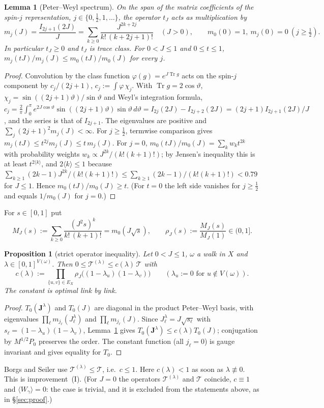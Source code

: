 \documentclass[11pt,a4paper]{article}
\theoremstyle{plain}
\newtheorem{proposition}[theorem]{Proposition}
\newtheorem{lemma}[theorem]{Lemma}
\theoremstyle{remark}
\numberwithin{equation}{section}
\newcommand{\Tr}{\operatorname{Tr}}
\newcommand{\cT}{\mathcal{T}}
\newcommand{\bs}{\boldsymbol}
\begin{document}
\begin{lemma}[Peter--Weyl spectrum]\label{lem:pw}
On the span of the matrix coefficients of the spin-$j$ representation, $j\in\{0,\frac12,1,\dots\}$, the operator $t_J$ acts as
multiplication by
\[
m_j(J)=\frac{I_{2j+1}(2J)}{J}=\sum_{k\ge0}\frac{J^{2k+2j}}{k!\,(k+2j+1)!}\quad(J>0),\qquad m_0(0)=1,\ m_j(0)=0\ (j\ge\tfrac12).
\]
In particular $t_J\ge0$ and $t_J$ is trace class. For $0<J\le1$ and $0\le t\le1$, $m_j(tJ)/m_j(J)\le m_0(tJ)/m_0(J)$ for every
$j$.
\end{lemma}
\begin{proof}
Convolution by the class function $\varphi(g)=e^{J\Tr g}$ acts on the spin-$j$ component by $c_j/(2j+1)$, $c_j:=\int\varphi\,\chi_j$.
With $\Tr g=2\cos\vartheta$, $\chi_j=\sin((2j+1)\vartheta)/\sin\vartheta$ and Weyl's integration formula,
$c_j=\frac2\pi\int_0^\pi e^{2J\cos\vartheta}\sin((2j+1)\vartheta)\sin\vartheta\,d\vartheta=I_{2j}(2J)-I_{2j+2}(2J)=(2j+1)I_{2j+1}(2J)/J$,
and the series is that of $I_{2j+1}$. The eigenvalues are positive and $\sum_j(2j+1)^2m_j(J)<\infty$.
For $j\ge\frac12$, termwise comparison gives $m_j(tJ)\le t^{2j}m_j(J)\le t\,m_j(J)$. For $j=0$, $m_0(tJ)/m_0(J)=\sum_kw_kt^{2k}$ with
probability weights $w_k\propto J^{2k}/(k!(k+1)!)$; by Jensen's inequality this is at least $t^{2\langle k\rangle}$, and
$2\langle k\rangle\le1$ because $\sum_{k\ge1}(2k-1)J^{2k}/(k!(k+1)!)\le\sum_{k\ge1}(2k-1)/(k!(k+1)!)<0.79$ for $J\le1$. Hence
$m_0(tJ)/m_0(J)\ge t$. (For $t=0$ the left side vanishes for $j\ge\frac12$ and equals $1/m_0(J)$ for $j=0$.)
\end{proof}

For $s\in[0,1]$ put
\begin{equation}\label{eq:rho}
M_J(s):=\sum_{k\ge0}\frac{(J^2s)^k}{k!\,(k+1)!}=m_0(J\sqrt s),\qquad \rho_J(s):=\frac{M_J(s)}{M_J(1)}\in(0,1].
\end{equation}

\begin{proposition}[strict operator inequality]\label{prop:strict}
Let $0<J\le1$, $\omega$ a walk in $X$ and $\lambda\in[0,1]^{V(\omega)}$. Then $0\le\cT^{(\lambda)}\le c(\lambda)\,\cT$ with
\[
c(\lambda):=\prod_{\{u,v\}\in E_X}\rho_J\big((1-\lambda_u)(1-\lambda_v)\big)\qquad(\lambda_u:=0\text{ for }u\notin V(\omega)).
\]
The constant is optimal link by link.
\end{proposition}
\begin{proof}
$T_0(\bs J^\lambda)$ and $T_0(J)$ are diagonal in the product Peter--Weyl basis, with eigenvalues $\prod_\ell m_{j_\ell}(J^\lambda_\ell)$
and $\prod_\ell m_{j_\ell}(J)$. Since $J^\lambda_\ell=J\sqrt{s_\ell}$ with $s_\ell=(1-\lambda_u)(1-\lambda_v)$, Lemma~\ref{lem:pw}
gives $T_0(\bs J^\lambda)\le c(\lambda)T_0(J)$; conjugation by $M^{1/2}P_0$ preserves the order. The constant function (all
$j_\ell=0$) is gauge invariant and gives equality for $T_0$.
\end{proof}
\noindent Borgs and Seiler use $\cT^{(\lambda)}\le\cT$, i.e.\ $c\le1$. Here $c(\lambda)<1$ as soon as $\lambda\not\equiv0$. This is
improvement~(I). (For $J=0$ the operators $\cT^{(\lambda)}$ and $\cT$ coincide, $c\equiv1$ and $\langle W_\gamma\rangle=0$: the case is
trivial, and it is excluded from the statements above, as in \S\ref{sec:proof}.)
\end{document}
